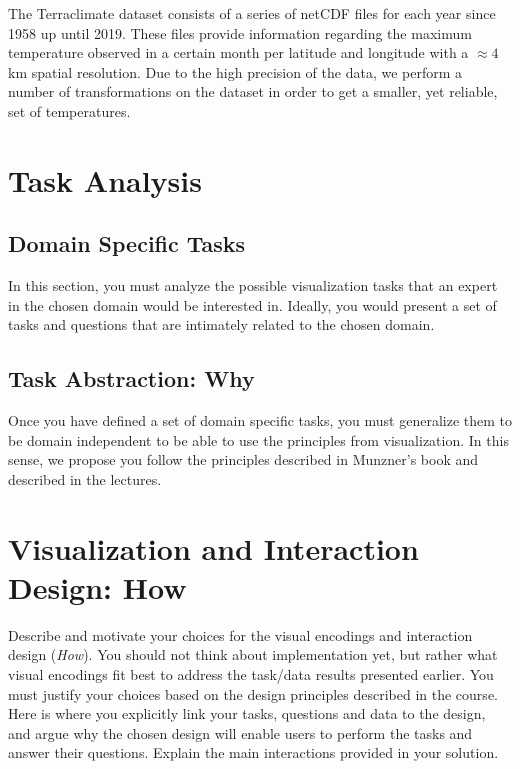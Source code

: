 \documentclass[journal]{vgtc}                %
\begin{document}
The Terraclimate dataset \cite{terraclimatedata} consists of a series of netCDF files for each year since 1958 up until 2019. These files provide information regarding the maximum temperature observed in a certain month per latitude and longitude with a $\approx 4$ km spatial resolution. Due to the high precision of the data, we perform a number of transformations on the dataset in order to get a smaller, yet reliable, set of temperatures.


\section{Task Analysis}

\subsection{Domain Specific Tasks}

In this section, you must analyze the possible visualization tasks that an expert in the chosen domain would be interested in. Ideally, you would present a set of tasks and questions that are intimately related to the chosen domain.

\subsection{Task Abstraction: Why}

Once you have defined a set of domain specific tasks, you must generalize them to be domain independent to be able to use the principles from visualization. In this sense, we propose you follow the principles described in Munzner's book \cite{munzner2014visualization} and described in the lectures.

\section{Visualization and Interaction Design: How}

Describe and motivate your choices for the visual encodings and interaction design (\emph{How}). You should not think about implementation yet, but rather what visual encodings fit best to address the task/data results presented earlier. You must justify your choices based on the design principles described in the course. Here is where you explicitly link your tasks, questions and data to the design, and argue why the chosen design will enable users to perform the tasks and answer their questions. Explain the main interactions provided in your solution.
\end{document}
